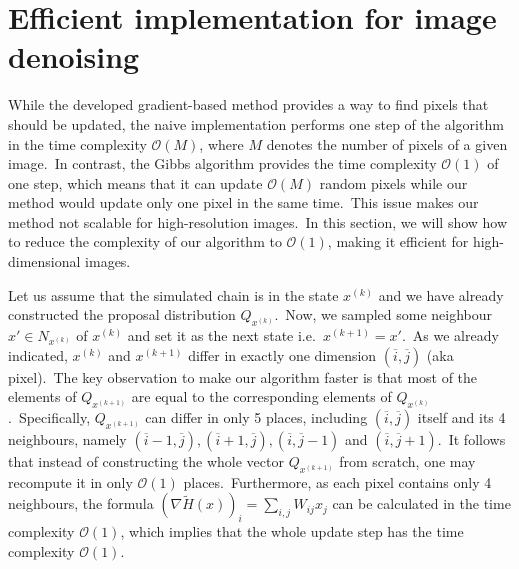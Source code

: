 \documentclass[shortabstract, english, lic]{iithesis}
\theoremstyle{default_theorem_style}\newtheorem{theorem}{Theorem}
\theoremstyle{default_theorem_style}\newtheorem{definition}{Definition}
\begin{document}
\section{Efficient implementation for image denoising}\label{sec:efficient_denoising}

While the developed gradient-based method provides a way to find pixels that should be updated, the naive
implementation performs one step of the algorithm in the time complexity $\mathcal{O}(M)$,
where $M$ denotes the number of pixels of a given image.\ In contrast, the Gibbs
algorithm provides the time complexity $\mathcal{O}(1)$ of one step, which means that it can update
$\mathcal{O}(M)$ random pixels while our method would update only one pixel in the same time.\ This issue makes
our method not scalable for high-resolution images.\ In this section, we will show how to reduce the complexity
of our algorithm to $\mathcal{O}(1)$, making it efficient for high-dimensional images.\newline

\noindent Let us assume that the simulated chain is in the state $x^{(k)}$ and we have already constructed the
proposal distribution $Q_{x^{(k)}}$.\ Now, we sampled some neighbour $x' \in N_{x^{(k)}}$ of $x^{(k)}$ and set it as the
next state i.e.\ $x^{(k + 1)} = x'$.\ As we already indicated, $x^{(k)}$ and $x^{(k + 1)}$ differ in exactly one
dimension $(\overline{i}, \overline{j})$ (aka pixel).\ The key observation to make our algorithm faster is that most of
the elements of $Q_{x^{(k + 1)}}$ are equal to the corresponding elements of $Q_{x^{(k)}}$.\ Specifically,
$Q_{x^{(k + 1)}}$ can differ in only 5 places, including $(\overline{i}, \overline{j})$ itself and its 4 neighbours,
namely $(\overline{i} - 1, \overline{j}), (\overline{i} + 1, \overline{j}), (\overline{i}, \overline{j} - 1)$ and
$(\overline{i}, \overline{j} + 1)$.\ It follows that instead of constructing the whole vector $Q_{x^{(k + 1)}}$
from scratch, one may recompute it in only $\mathcal{O}(1)$ places.\ Furthermore, as each pixel contains only 4
neighbours, the formula $(\nabla \tilde{H}(x))_i = \sum_{i, j} W_{ij} x_j$ can be calculated in the time complexity
$\mathcal{O}(1)$, which implies that the whole update step has the time complexity $\mathcal{O}(1)$.\newline
\end{document}
